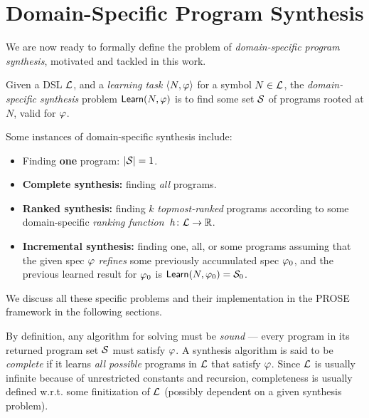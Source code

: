 \section{Domain-Specific Program Synthesis}
\label{sec:background:problem}
We are now ready to formally define the problem of \emph{domain-specific program synthesis}, motivated and tackled in
this work.

\begin{problem}
    \label{problem:syn:general}
    Given a DSL $\mathcal{L}$, and a \emph{learning task} $\langle N, \varphi\rangle$ for a symbol $N \in \mathcal{L}$, the
    \emph{domain\hyp{}specific synthesis} problem $\mathsf{Learn}(N, \varphi)$ is to find some set $\mathcal{S}$ of programs
    rooted at $N$, valid for $\varphi$.

    Some instances of domain-specific synthesis include:
    \begin{itemize}[nosep]
        \item Finding \textbf{one} program: $|\mathcal{S}| = 1$.
        \item \textbf{Complete synthesis:} finding \emph{all} programs.
        \item \textbf{Ranked synthesis:} finding $k$ \emph{topmost-ranked} programs according to some domain-specific
            \emph{ranking function}~$h\colon\mathcal{L} \to \mathbb{R}$.
        \item \textbf{Incremental synthesis:} finding one, all, or some programs assuming that the given spec $\varphi$
            \emph{refines} some previously accumulated spec $\varphi_0$, and the previous learned result for $\varphi_0$ is
            $\mathsf{Learn}(N, \varphi_0) = \mathcal{S}_0$.
    \end{itemize}
    We discuss all these specific problems and their implementation in the PROSE framework in the following sections.
\end{problem}

By definition, any algorithm for solving  must be \emph{sound} --- every program in its
returned program set $\mathcal{S}$ must satisfy $\varphi$.
A synthesis algorithm is said to be \emph{complete} if it learns \emph{all possible} programs in $\mathcal{L}$ that satisfy $\varphi$.
Since $\mathcal{L}$ is usually infinite because of unrestricted constants and recursion, completeness is usually defined w.r.t.
some finitization of $\mathcal{L}$ (possibly dependent on a given synthesis problem).
